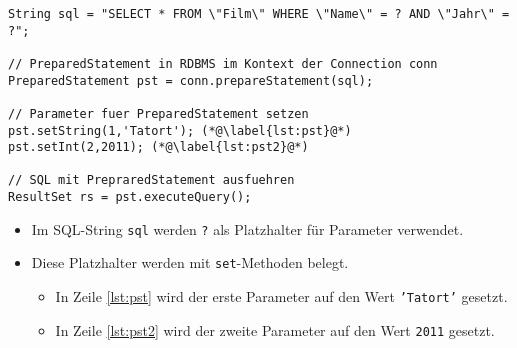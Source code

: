 \begin{frame}[fragile]
\frametitle{\insertsection}
\framesubtitle{\insertsubsection}
\onslide
{}
\lstset{language=Java}
\begin{lstlisting}[xleftmargin=3ex, showstringspaces=false]
String sql = "SELECT * FROM \"Film\" WHERE \"Name\" = ? AND \"Jahr\" = ?";

// PreparedStatement in RDBMS im Kontext der Connection conn
PreparedStatement pst = conn.prepareStatement(sql); 

// Parameter fuer PreparedStatement setzen
pst.setString(1,'Tatort'); (*@\label{lst:pst}@*)
pst.setInt(2,2011); (*@\label{lst:pst2}@*)

// SQL mit PrepraredStatement ausfuehren
ResultSet rs = pst.executeQuery(); 
\end{lstlisting}
\pause
\begin{itemize}
	\item Im SQL-String \texttt{sql} werden \texttt{?} als Platzhalter f\"ur Parameter verwendet.
	\item Diese Platzhalter werden mit \texttt{set}-Methoden belegt.
	\begin{itemize}
		\item In Zeile \ref{lst:pst} wird der erste Parameter auf den Wert \texttt{'Tatort'} gesetzt. 
		\item In Zeile \ref{lst:pst2} wird der zweite Parameter auf den Wert \texttt{2011} gesetzt. 
	\end{itemize}
\end{itemize}
\end{frame}

